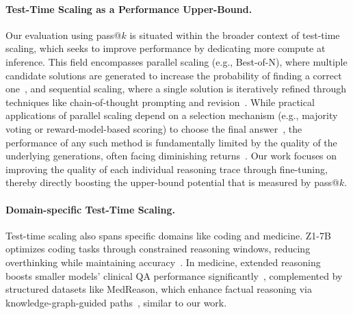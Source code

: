 \documentclass[11pt]{article}
\begin{document}
\paragraph{Test-Time Scaling as a Performance Upper-Bound.}
Our evaluation using pass@$k$ is situated within the broader context of test-time scaling, which seeks to improve performance by dedicating more compute at inference. This field encompasses parallel scaling (e.g., Best-of-N), where multiple candidate solutions are generated to increase the probability of finding a correct one~\citep{chollet2019measure, irvine2023rewarding, brown2024large, li2022competition}, and sequential scaling, where a single solution is iteratively refined through techniques like chain-of-thought prompting and revision~\citep{wei2022chain, nye2021show, madaan2024self, lee2025evolving, hou2025advancing, huang2022large, min2024imitate, muennighoff2025s1simpletesttimescaling, wang2024theoretical, li2025llms, jurayj2025finalanswertesttimescaling}. While practical applications of parallel scaling depend on a selection mechanism (e.g., majority voting or reward-model-based scoring) to choose the final answer~\citep{wang2022self, christiano2017deep, lightman2023letsverifystepstep, wang2024math, wu2024inference, beeching2024dvts, pan2024swegym, hassid2024larger, stroebl2024inference}, the performance of any such method is fundamentally limited by the quality of the underlying generations, often facing diminishing returns~\citep{brown2024largelanguagemonkeysscaling, snell2024scalingllmtesttimecompute, wu2024inference, levi2024simplemodelinferencescaling}. Our work focuses on improving the quality of each individual reasoning trace through fine-tuning, thereby directly boosting the upper-bound potential that is measured by pass@$k$.

\paragraph{Domain-specific Test-Time Scaling.}
Test-time scaling also spans specific domains like coding and medicine. Z1-7B optimizes coding tasks through constrained reasoning windows, reducing overthinking while maintaining accuracy~\citep{yu2025z1efficienttesttimescaling}. In medicine, extended reasoning boosts smaller models’ clinical QA performance significantly~\citep{huang2025m1unleashpotentialtesttime}, complemented by structured datasets like MedReason, which enhance factual reasoning via knowledge-graph-guided paths~\citep{wu2025medreasonelicitingfactualmedical}, similar to our work.
\end{document}
